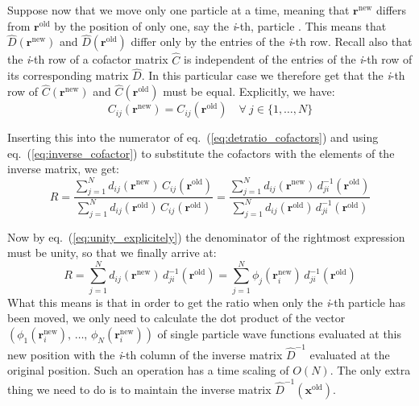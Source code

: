 Suppose now that we move only one particle  at a time, meaning that
$\mathbf{r}^{\mathrm{new}}$ differs from $\mathbf{r}^{\mathrm{old}}$ by the
position of only one, say the \emph{i}-th, particle . This means that $\hat{D}(\mathbf{r}^{\mathrm{new}})$ and $\hat{D}(\mathbf{r}^{\mathrm{old}})$ differ
only by the entries of the \emph{i}-th row.  Recall also that the \emph{i}-th row
of a cofactor matrix $\hat{C}$ is independent of the entries of the
\emph{i}-th row of its corresponding matrix $\hat{D}$. In this particular
case we therefore get that the \emph{i}-th row of $\hat{C}(\mathbf{r}^{\mathrm{new}})$ 
and $\hat{C}(\mathbf{r}^{\mathrm{old}})$ must be
equal. Explicitly, we have:
\begin{equation}
C_{ij}(\mathbf{r}^{\mathrm{new}}) = C_{ij}(\mathbf{r}^{\mathrm{old}})\quad
\forall\ j\in\{1,\dots,N\}
\end{equation}

Inserting this into the numerator of eq.~(\ref{eq:detratio_cofactors})
and using eq.~(\ref{eq:inverse_cofactor}) to substitute the cofactors
with the elements of the inverse matrix, we get:
\begin{equation}
R =\frac{\sum_{j=1}^N d_{ij}(\mathbf{r}^{\mathrm{new}})\,
C_{ij}(\mathbf{r}^{\mathrm{old}})}
{\sum_{j=1}^N d_{ij}(\mathbf{r}^{\mathrm{old}})\,
C_{ij}(\mathbf{r}^{\mathrm{old}})} =
\frac{\sum_{j=1}^N d_{ij}(\mathbf{r}^{\mathrm{new}})\,
d_{ji}^{-1}(\mathbf{r}^{\mathrm{old}})}
{\sum_{j=1}^N d_{ij}(\mathbf{r}^{\mathrm{old}})\,
d_{ji}^{-1}(\mathbf{r}^{\mathrm{old}})}
\end{equation}

Now by eq.~(\ref{eq:unity_explicitely}) the denominator of the rightmost
expression must be unity, so that we finally arrive at:
\begin{equation}
R =
\sum_{j=1}^N d_{ij}(\mathbf{r}^{\mathrm{new}})\,
d_{ji}^{-1}(\mathbf{r}^{\mathrm{old}}) = 
\sum_{j=1}^N \phi_j(\mathbf{r}_i^{\mathrm{new}})\,
d_{ji}^{-1}(\mathbf{r}^{\mathrm{old}})
\label{eq:detratio_inverse}
\end{equation}
What this means is that in order to get the ratio when only the \emph{i}-th
particle  has been moved, we only need to calculate the dot
product of the vector $\left(\phi_1(\mathbf{r}_i^\mathrm{new}),\,\dots,\,\phi_N(\mathbf{r}_i^\mathrm{new})\right)$ of single particle  wave functions
evaluated at this new position with the \emph{i}-th column of the inverse
matrix $\hat{D}^{-1}$ evaluated at the original position. Such
an operation has a time scaling of $O(N)$. The only extra thing we
need to do is to maintain the inverse matrix $\hat{D}^{-1}(\mathbf{x}^{\mathrm{old}})$.

